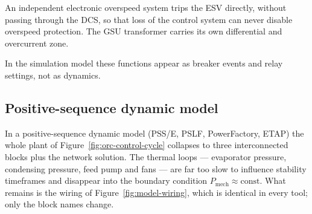 An independent electronic overspeed system trips the ESV directly, without
passing through the DCS, so that loss of the control system can never disable
overspeed protection. The GSU transformer carries its own differential and
overcurrent zone.

In the simulation model these functions appear as breaker events and relay
settings, not as dynamics.

\subsection{Positive-sequence dynamic model}
\label{sec:model}
In a positive-sequence dynamic model (PSS/E, PSLF, PowerFactory, ETAP) the whole
plant of Figure~\ref{fig:orc-control-cycle} collapses to three interconnected
blocks plus the network solution. The thermal loops --- evaporator pressure,
condensing pressure, feed pump and fans --- are far too slow to influence
stability timeframes and disappear into the boundary condition
$P_{\mathrm{mech}} \approx \mathrm{const}$. What remains is the wiring of
Figure~\ref{fig:model-wiring}, which is identical in every tool; only the block
names change.


